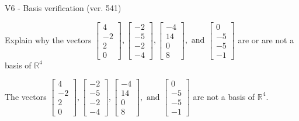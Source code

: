 \begin{exercise}
  \begin{exerciseTitle}V6 - Basis verification (ver. 541)\end{exerciseTitle}
  \begin{exerciseStatement}
    Explain why the vectors \(\left[\begin{array}{r}
4 \\
-2 \\
2 \\
0
\end{array}\right] , \left[\begin{array}{r}
-2 \\
-5 \\
-2 \\
-4
\end{array}\right] , \left[\begin{array}{r}
-4 \\
14 \\
0 \\
8
\end{array}\right] , \text{ and } \left[\begin{array}{r}
0 \\
-5 \\
-5 \\
-1
\end{array}\right]\) are or are not a basis of \(\mathbb{R}^4\)	


  \end{exerciseStatement}
  \begin{exerciseAnswer}
   The vectors \(\left[\begin{array}{r}
4 \\
-2 \\
2 \\
0
\end{array}\right] , \left[\begin{array}{r}
-2 \\
-5 \\
-2 \\
-4
\end{array}\right] , \left[\begin{array}{r}
-4 \\
14 \\
0 \\
8
\end{array}\right] , \text{ and } \left[\begin{array}{r}
0 \\
-5 \\
-5 \\
-1
\end{array}\right]\) 
  	 are not  a basis of \(\mathbb{R}^4\).
  


  \end{exerciseAnswer}
\end{exercise}
